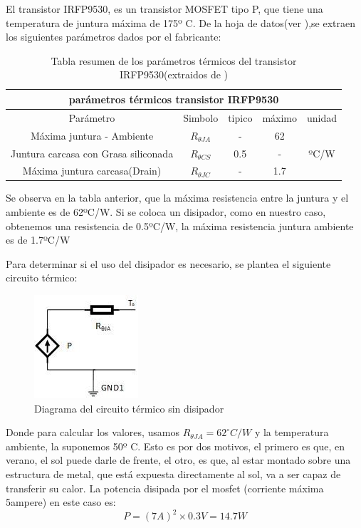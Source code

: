 El transistor IRFP9530, es un transistor MOSFET tipo P, que tiene una temperatura de juntura máxima de 175º C. De la hoja de datos(ver \cite{IRF9530}),se extraen los siguientes parámetros dados por el fabricante: 
\begin{table}[ht!]
	\centering
	\begin{tabular}{|c|c|c|c|c|}
		\hline 
		\multicolumn{5}{|c|}{parámetros térmicos transistor IRFP9530}\\ \hline 
		Parámetro & Simbolo & tipico & máximo & unidad \\ \hline 
		Máxima juntura - Ambiente &$R_{\theta JA}$ & - &62 & \multirow{3}{*}{ºC/W} \\ \cline{1-4} 
		Juntura carcasa con Grasa siliconada &$R_{\theta CS}$ & 0.5 &-& \\ \cline{1-4} 
		Máxima juntura carcasa(Drain) &$R_{\theta JC}$ & - &1.7& \\ \hline
	\end{tabular}
\caption{Tabla resumen de los parámetros térmicos del transistor IRFP9530(extraidos de \cite{IRF9530})} 
\label{tab:par_ter_irfp9530}
\end{table}


Se observa en la tabla anterior, que la máxima resistencia entre la juntura y el ambiente es de 62ºC/W. Si se coloca un disipador, como en nuestro caso, obtenemos una resistencia de 0.5ºC/W, la  máxima resistencia juntura ambiente es de 1.7ºC/W

Para determinar si el uso del disipador es necesario, se plantea el siguiente circuito térmico: 
\begin{figure}
\vspace{-20mm}	
\caption{Diagrama del circuito térmico sin disipador}	
\includegraphics{circuito_termico_1}

\end{figure}
\newline 








Donde para calcular los valores, usamos $R_{\theta JA}= 62^\circ C/W$ y la temperatura ambiente, la suponemos 50º C. Esto es por dos motivos, el primero es que, en verano, el sol puede darle de frente, el otro, es que, al estar montado sobre una estructura de metal, que está expuesta directamente al sol, va a ser capaz de transferir su calor. La potencia disipada por el mosfet (corriente máxima 5ampere) en este caso es: 
\[
	P = (7A)^2 \times 0.3 V = 14.7 W 
\]

